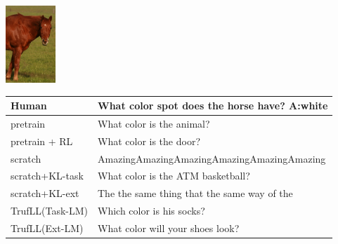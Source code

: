 \documentclass{article}
\newcommand{\algo}{TrufLL\xspace}
\begin{document}
\begin{table}[t!]
   \begin{minipage}{0.2\linewidth}
        \includegraphics[height=110px]{./COCO_val2014_000000275025.jpeg}
	\end{minipage}
	\hfill
	\begin{minipage}{0.80\linewidth}
		\scriptsize
		\begin{tabular}{ll}
			Human           & What color spot does the horse have?  \quad \textbf{A:white} \\
			\midrule
			pretrain        & What color is the animal? \\
		    pretrain + RL   & What color is the door? \\ \midrule
			scratch         & AmazingAmazingAmazingAmazingAmazingAmazing  \\
			scratch+KL-task & What color is the ATM basketball? \\
			scratch+KL-ext  & The the same thing that the same way of the\\ \midrule
			\algo(Task-LM) & Which color is his socks? \\
			\algo(Ext-LM)   & What color will your shoes look? \\
			\bottomrule
		\end{tabular}
	\end{minipage}
	\vspace{1mm}



\end{table}
\end{document}
